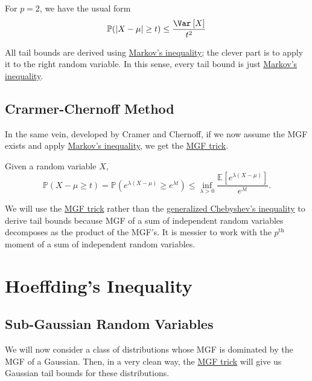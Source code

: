 \begin{remark}
  For \(p = 2\), we have the usual form
  \[
    \mathbb{P} (\vert X - \mu  \vert \geq t) \leq \frac{\Var_{}\left[X \right] }{t^2}
  \]
\end{remark}

\begin{remark}
  All tail bounds are derived using \hyperref[lma:Markov-inequality]{Markov's inequality}; the clever part is to apply it to the right random variable. In this sense, every tail bound is just \hyperref[lma:Markov-inequality]{Markov's inequality}.
\end{remark}

\subsection{Crarmer-Chernoff Method}
In the same vein, developed by Cramer and Chernoff, if we now assume the MGF exists and apply \hyperref[lma:Markov-inequality]{Markov's inequality}, we get the \hyperref[lma:MGF-trick]{MGF trick}.

\begin{lemma}\label{lma:MGF-trick}
  Given a random variable \(X\),
  \[
    \mathbb{P} (X - \mu \geq t) = \mathbb{P} (e^{\lambda (X - \mu ) } \geq e^{\lambda t}) \leq \inf _{\lambda > 0} \frac{\mathbb{E}_{}\left[e^{\lambda (X - \mu )} \right] }{e^{\lambda t}}.
  \]
\end{lemma}

We will use the \hyperref[lma:MGF-trick]{MGF trick} rather than the \hyperref[lma:Chebyshev-inequality]{generalized Chebyshev's inequality} to derive tail bounds because MGF of a sum of independent random variables decomposes as the product of the MGF's. It is messier to work with the \(p^{\text{th} } \) moment of a sum of independent random variables.

\section{Hoeffding's Inequality}
\subsection{Sub-Gaussian Random Variables}
We will now consider a class of distributions whose MGF is dominated by the MGF of a Gaussian. Then, in a very clean way, the \hyperref[lma:MGF-trick]{MGF trick} will give us Gaussian tail bounds for these distributions.

